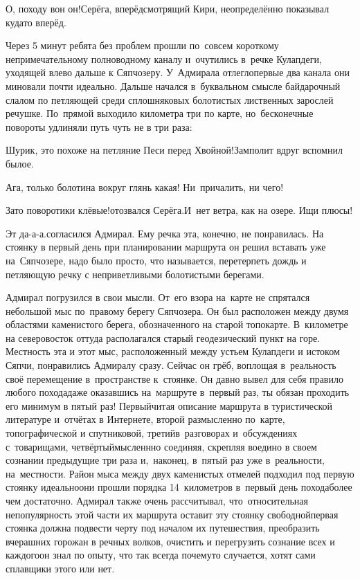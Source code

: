 \diagdash О, походу вон он!\mdash Серёга, вперёдсмотрящий Кири, неопределённо показывал куда\sdash то вперёд.

Через 5 минут ребята без проблем прошли по~совсем короткому непримечательному полноводному каналу и~очутились в~речке Кулапдеги, уходящей влево дальше к Сяпчозеру. У~Адмирала отлегло\mdash первые два канала они миновали почти идеально. Дальше начался в~буквальном смысле байдарочный слалом по петляющей среди сплошняковых болотистых лиственных зарослей речушке. По~прямой выходило километра три по карте, но~бесконечные повороты удлиняли путь чуть не в три раза:

\diagdash Шурик, это похоже на петляние Песи перед Хвойной!\mdash Замполит вдруг вспомнил былое.

\diagdash Ага, только болотина вокруг глянь какая! Ни~причалить, ни чего!

\diagdash Зато поворотики клёвые!\mdash отозвался Серёга.\mdash И~нет ветра, как на озере. Ищи плюсы!

\diagdash Эт да-а-а.\mdash согласился Адмирал. Ему речка эта, конечно, не понравилась. На стоянку в первый день при планировании маршрута  он решил вставать уже на~Сяпчозере, надо было просто, что называется, перетерпеть дождь и петляющую речку с неприветливыми болотистыми берегами. 

Адмирал погрузился в свои мысли. От~его взора на~карте не спрятался небольшой мыс по~правому берегу Сяпчозера. Он был расположен между двумя областями каменистого берега, обозначенного на старой топокарте. В~километре на северо\sdash восток оттуда располагался старый геодезический пункт на горе. Местность эта и этот мыс, расположенный между устьем Кулапдеги и истоком Сяпчи, понравились Адмиралу сразу. Сейчас он грёб, воплощая в~реальность своё перемещение в~пространстве к~стоянке. Он давно вывел для себя правило любого похода\mdash даже оказавшись на~маршруте в~первый раз, ты обязан проходить его минимум в пятый раз! Первый\mdash читая описание маршрута в туристической литературе и~отчётах в Интернете, второй раз\mdash мысленно по~карте, топографической и спутниковой, третий\mdash в~разговорах и~обсуждениях с~товарищами, четвёртый\mdash мысленнно соединяя, скрепляя воедино в своем сознании предыдущие три раза и,~наконец, в~пятый раз уже в~реальности, на~местности. Район мыса между двух каменистых отмелей подходил под первую стоянку идеально\mdash они прошли порядка 14~километров в~первый день похода\mdash более чем достаточно. Адмирал также очень рассчитывал, что~относительная непопулярность этой части их маршрута оставит эту стоянку свободной\mdash первая стоянка должна подвести черту под началом их путешествия, преобразить вчерашних горожан в речных волков, очистить и перегрузить сознание всех и каждого\mdash он знал по опыту, что так всегда почему\sdash то случается, хотят сами сплавщики этого или нет. 

